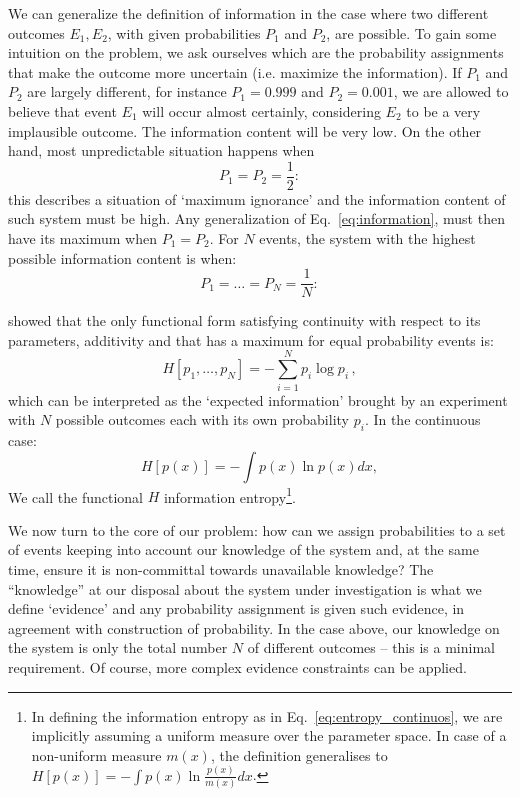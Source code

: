 \documentclass{aa}
\begin{document}
We can generalize the definition of information in the case where two different outcomes $E_1, E_2$, with given probabilities $P_1$ and $P_2$, are possible.
To gain some intuition on the problem, we ask ourselves which are the probability assignments that make the outcome more uncertain (i.e. maximize the information).
If $P_1$ and $P_2$ are largely different, for instance $P_1 = 0.999$ and $P_2 = 0.001$, we are allowed to believe that event $E_1$ will occur almost certainly, considering $E_2$ to be a very implausible outcome. The information content will be very low.
On the other hand, most unpredictable situation happens when 
\begin{equation}\nonumber
    P_1 = P_2 = \frac{1}{2}:
\end{equation}
this describes a situation of `maximum ignorance' and the information content of such system must be high.
Any generalization of Eq.~\eqref{eq:information}, must then have its maximum when $ P_1 = P_2$.
For $N$ events, the system with the highest possible information content is when:
\begin{equation}\nonumber
    P_1 = \hdots = P_N = \frac{1}{N}:
\end{equation}

\citet{Shannon} showed that the only functional form satisfying continuity with respect to its parameters, additivity and that has a maximum for equal probability events is:
\begin{equation}\label{eq:entropy}
    H[p_1, \dots, p_N] = - \sum_{i = 1}^N p_i\log{p_i}\,,
\end{equation}
which can be interpreted as the `expected information' brought by an experiment with $N$ possible outcomes each with its own probability $p_i$.
In the continuous case:
\begin{equation} \label{eq:entropy_continuos}
    H[p(x)] = - \int p(x)\ln p(x) dx,
\end{equation}
We call the functional $H$ information entropy\footnote{In defining the information entropy as in Eq.~\eqref{eq:entropy_continuos}, we are implicitly assuming a uniform measure over the parameter space. In case of a non-uniform measure $m(x)$, the definition generalises to $ H[p(x)] = - \int p(x)\ln \frac{p(x)}{m(x)} dx$.}.

We now turn to the core of our problem: how can we assign probabilities to a set of events keeping into account our knowledge of the system and, at the same time, ensure it is non-committal towards unavailable knowledge?
The ``knowledge'' at our disposal about the system under investigation is what we define `evidence' and any probability assignment is given such evidence, in agreement with \citet{Cox} construction of probability. In the case above, our knowledge on the system is only the total number $N$ of different outcomes -- this is a minimal requirement. Of course, more complex evidence constraints can be applied.
\end{document}
